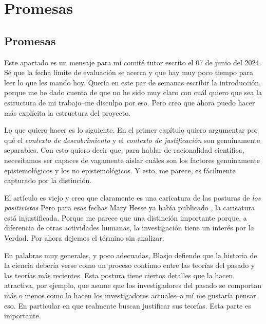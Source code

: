 \chapter{Promesas}

\section{Promesas}

\noindent Este apartado es un mensaje para mi comité tutor escrito el 07 de junio del 2024. Sé que la fecha límite de evaluación se acerca y que hay muy poco tiempo para leer lo que les mando hoy.
Quería en este par de semanas escribir la introducción, porque me he dado cuenta de que no he sido muy claro con cuál quiero que sea la estructura de mi trabajo--me disculpo por eso.
Pero creo que ahora puedo hacer más explícita la estructura del proyecto.

Lo que quiero hacer es lo siguiente.
En el primer capítulo quiero argumentar por qué el \emph{contexto de descubrimiento} y el \emph{contexto de justificación} son genuinamente separables.
Con esto quiero decir que, para hablar de racionalidad científica, necesitamos ser capaces de vagamente aislar cuáles son los factores genuinamente epistemológicos y los no epistemológicos.
Y esto, me parece, es fácilmente capturado por la distinción.

El artículo es viejo y creo que claramente es una caricatura de las posturas de \emph{los positivistas}
Pero para esas fechas Mary Hesse ya había publicado , la caricatura está injustificada.
Porque me parece que una distinción importante porque, a diferencia de otras actividades humanas, la investigación tiene un interés por la Verdad.
Por ahora dejemos el término sin analizar.

En palabras muy generales, y poco adecuadas, Blasjo defiende que la historia de la ciencia debería verse como un proceso continuo entre las teorías del pasado y las teorías más recientes.
Esta postura tiene ciertos detalles que la hacen atractiva, por ejemplo, que asume que los investigadores del pasado se comportan más o menos como lo hacen los investigadores actuales--a mí me gustaría pensar eso.
En particular en que realmente buscan justificar sus teorías.
Esta parte es importante.

